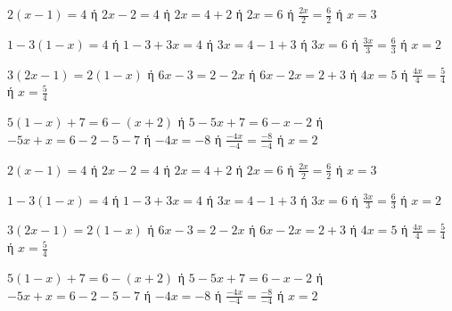 \begin{alist}
\item $ 2(x-1)=4 $ ή $ 2x-2=4 $ ή $ 2x=4+2 $ ή $ 2x=6 $ ή $ \frac{2x}{2}=\frac{6}{2} $ ή $ x=3 $
\item $ 1-3(1-x)=4 $ ή $ 1-3+3x=4 $ ή $ 3x=4-1+3 $ ή $ 3x=6 $ ή $ \frac{3x}{3}=\frac{6}{3} $ ή $ x=2 $
\item $ 3(2x-1)=2(1-x) $ ή $ 6x-3=2-2x $ ή $ 6x-2x=2+3 $ ή $ 4x=5 $ ή $ \frac{4x}{4}=\frac{5}{4} $ ή $ x=\frac{5}{4} $
\item $ 5(1-x)+7=6-(x+2) $ ή $ 5-5x+7=6-x-2 $ ή $ -5x+x=6-2-5-7 $ ή $ -4x=-8 $ ή $ \frac{-4x}{-4}=\frac{-8}{-4} $ ή $ x=2 $
\end{alist}
\begin{alist}
\item $ 2(x-1)=4 $ ή $ 2x-2=4 $ ή $ 2x=4+2 $ ή $ 2x=6 $ ή $ \frac{2x}{2}=\frac{6}{2} $ ή $ x=3 $
\item $ 1-3(1-x)=4 $ ή $ 1-3+3x=4 $ ή $ 3x=4-1+3 $ ή $ 3x=6 $ ή $ \frac{3x}{3}=\frac{6}{3} $ ή $ x=2 $
\item $ 3(2x-1)=2(1-x) $ ή $ 6x-3=2-2x $ ή $ 6x-2x=2+3 $ ή $ 4x=5 $ ή $ \frac{4x}{4}=\frac{5}{4} $ ή $ x=\frac{5}{4} $
\item $ 5(1-x)+7=6-(x+2) $ ή $ 5-5x+7=6-x-2 $ ή $ -5x+x=6-2-5-7 $ ή $ -4x=-8 $ ή $ \frac{-4x}{-4}=\frac{-8}{-4} $ ή $ x=2 $
\end{alist}
